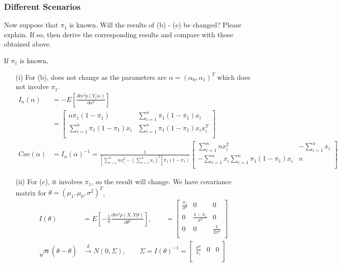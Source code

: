 \documentclass[11pt]{article} %
\begin{document}
	\subsubsection{Different Scenarios}
	Now suppose that $\pi_1$ is known. Will the results of (b) - (e) be changed? Please
	explain. If so, then derive the corresponding results and compare with those obtained
	above.
	
	If $\pi_1$ is known,
	\begin{itemize}
		\item [(i)] For (b), does not change as the parameters are $\alpha = (\alpha_0, \alpha_1)^T$ which does not involve $\pi_1$.
		\begin{align*}
			I_n(\alpha) &= -E[ \frac{\partial ln^2 p(Y_i|\alpha)}{\partial \alpha^2}]\\
			&= \begin{bmatrix}
				n \pi_1 (1-\pi_1) &   \sum_{i=1}^n \pi_1 (1-\pi_1)x_i\\
				\sum_{i=1}^n \pi_1 (1-\pi_1)x_i &  \sum_{i=1}^n \pi_1 (1-\pi_1)x_ix_i^T\\
			\end{bmatrix}\\
			Cov(\alpha) &= I_n(\alpha)^{-1} = \frac{1}{[\sum_{i=1}^n n x_i^2 - (\sum_{i=1}^n x_i)^2]\pi_1 (1-\pi_1)}  \begin{bmatrix}
				\sum_{i=1}^n n x_i^2 &   -\sum_{i=1}^n x_i\\
				-\sum_{i=1}^n x_i\sum_{i=1}^n \pi_1 (1-\pi_1)x_i & n\\
			\end{bmatrix}
		\end{align*} 
		\item[(ii)] For (c), it involves $\pi_1$, so the result will change. We have covariance matrix for $\theta = (\mu_1, \mu_0, \sigma^2)^T$, 
		\begin{align*}    
			I(\theta) &= E[- \frac{1}{n} \frac{\partial ln^2 p(X,Y|\theta)}{\partial \theta^2}], \qquad
			= \begin{bmatrix}
				\frac{\pi_1}{\sigma^2} & 0 & 0\\
				0 & \frac{1-\pi_1}{\sigma^2} & 0\\
				0 & 0 & \frac{1}{2\sigma^4} \\
			\end{bmatrix}\\
			\sqrt{n} (\hat{\theta} - \theta) & \xrightarrow[]{d} N \left(0, \Sigma \right), \qquad
			\Sigma = I(\theta)^{-1} = \begin{bmatrix}
				\frac{\sigma^2}{ \pi_1} & 0 & 0\\

\end{bmatrix}
\end{align*}
\end{itemize}
\end{document}

